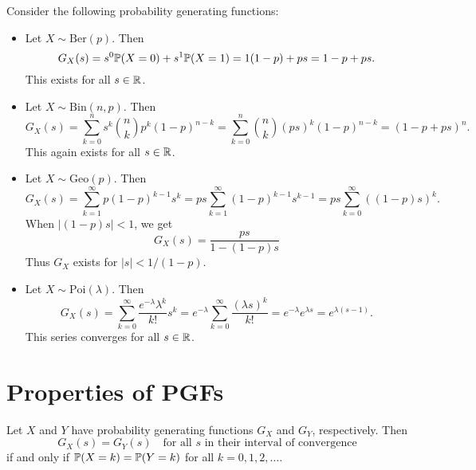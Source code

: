 \begin{example}
  Consider the following probability generating
  functions:
  \begin{itemize}
    \item Let $X \sim \mathrm{Ber}(p)$. Then
      \[
        G_X(s) = s^0 \mathbb{P}(X = 0)
        + s^1 \mathbb{P}(X = 1)
        = 1(1 - p) + ps = 1 - p + ps.
      \]
      This exists for all $s \in \mathbb{R}$.
    \item Let $X \sim \mathrm{Bin}(n, p)$. Then
      \[
        G_X(s) = \sum_{k = 0}^n s^k \binom{n}{k} p^k (1 - p)^{n - k}
        = \sum_{k = 0}^n \binom{n}{k} (ps)^k (1 - p)^{n - k}
        = (1 - p + ps)^n.
      \]
      This again exists for all $s \in \mathbb{R}$.
    \item Let $X \sim \mathrm{Geo}(p)$. Then
      \[
        G_X(s)
        = \sum_{k = 1}^\infty p(1 - p)^{k - 1} s^k
        = ps \sum_{k = 1}^\infty (1 - p)^{k - 1} s^{k - 1}
        = ps \sum_{k = 0}^\infty ((1 - p) s)^k.
      \]
      When $|(1 - p) s| < 1$, we get
      \[
        G_X(s)
        = \frac{ps}{1 - (1 - p)s}
      \]
      Thus $G_X$ exists
      for $|s| < 1 / (1 - p)$.
    \item Let $X \sim \mathrm{Poi}(\lambda)$.
      Then
      \[
        G_X(s)
        = \sum_{k = 0}^\infty \frac{e^{-\lambda} \lambda^k}{k!} s^k
        = e^{-\lambda} \sum_{k = 0}^\infty \frac{(\lambda s)^k}{k!}
        = e^{-\lambda} e^{\lambda s}
        = e^{\lambda(s - 1)}.
      \]
      This series converges for all $s \in \mathbb{R}$.
  \end{itemize}
\end{example}

\section{Properties of PGFs}
\begin{theorem}
  Let $X$ and $Y$ have probability generating
  functions
  $G_X$ and $G_Y$, respectively.
  Then
  \[G_X(s) = G_Y(s)
    \quad \text{for all $s$ in their interval of convergence} 
  \]
  if and only if $\mathbb{P}(X = k) = \mathbb{P}(Y = k)$ for
  all $k = 0, 1, 2, \dots$.
\end{theorem}

